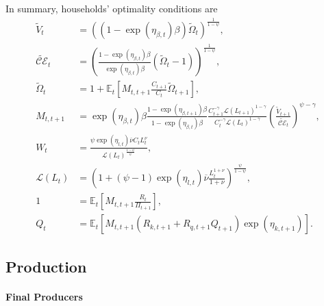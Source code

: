 \documentclass[12 pt, oneside]{article}
\theoremstyle{definition}
\theoremstyle{definition}
\theoremstyle{definition}
\newcommand{\E}{\mathbb{E}}
\newcommand{\calC}{\mathcal{C}}
\newcommand{\calE}{\mathcal{E}}
\newcommand{\calL}{\mathcal{L}}
\begin{document}
In summary, households' optimality conditions are
\begin{align}
  \label{eq:epstein zin defn}
  \tilde{V}_t & = ((1 - \exp(\eta_{\beta, t})\beta)\tilde{\Omega}_t)^{\frac{1}{1 - \psi}},\\
  \label{eq:certainty equivalent}
  \tilde{\calC\calE}_t & = \left(\frac{1 - \exp(\eta_{\beta, t})\beta}{\exp(\eta_{\beta, t})\beta}(\tilde{\Omega}_t - 1)\right)^{\frac{1}{1 - \psi}},\\
  \label{eq:epstein zin wealth recursion}
  \tilde{\Omega}_t & = 1 + \E_t\left[M_{t, t + 1}\frac{C_{t + 1}}{C_t}\tilde{\Omega}_{t + 1}\right],\\
  \label{eq:stochastic discount factor}
  M_{t, t + 1} & = \exp(\eta_{\beta, t})\beta\frac{1 - \exp(\eta_{\beta, t + 1})\beta}{1 - \exp(\eta_{\beta, t})\beta} \frac{C_{t + 1}^{- \gamma } \calL(L_{t + 1})^{1 - \gamma}}{C_t^{-\gamma} \calL(L_t)^{1 - \gamma}}\left(\frac{\tilde{V}_{t + 1}}{\tilde{\calC\calE}_t}\right)^{ \psi - \gamma},\\
  \label{eq:intratemporal consumption labor}
  W_t & = \frac{\psi \exp(\eta_{l, t})\overline{\nu} C_t L_t^\nu}{\calL(L_t)^{\frac{1 - \psi}{\psi}}},\\
  \label{eq:labor disutility function}
  \calL(L_t) & = \left(1 + (\psi - 1)\exp(\eta_{l, t})\overline{\nu}\frac{L_t^{1 + \nu}}{1 + \nu}\right)^{\frac{\psi}{1-\psi}},\\
  \label{eq:euler eqn}
  1 & = \E_t\left[M_{t, t + 1}\frac{R_t}{\Pi_{t + 1}}\right],\\
  \label{eq:capital asset pricing}
  Q_t & = \E_t\left[M_{t, t + 1} \left(R_{k, t + 1} + R_{q, t + 1}Q_{t + 1}\right)\exp(\eta_{k, t + 1})\right].
\end{align}




\subsection{Production}

\paragraph{Final Producers}
\end{document}
